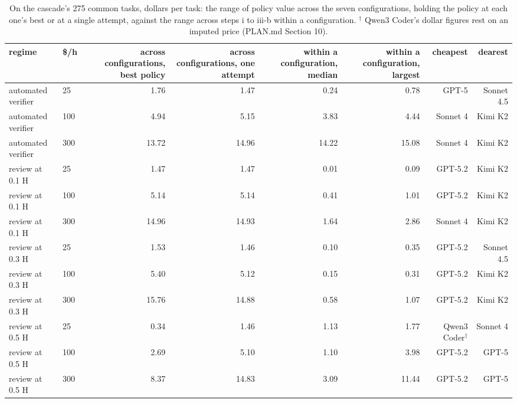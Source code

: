 \begin{table}[t]
\centering
\small
\caption{On the cascade's 275 common tasks, dollars per task: the range of policy value across the seven configurations, holding the policy at each one's best or at a single attempt, against the range across steps i to iii-b within a configuration. $^\dagger$ Qwen3 Coder's dollar figures rest on an imputed price (PLAN.md Section 10).}
\label{tab:tableA8_spread}
\begin{tabular}{llrrrrrr}
\toprule
regime & \$/h & across configurations, best policy & across configurations, one attempt & within a configuration, median & within a configuration, largest & cheapest & dearest \\
\midrule
automated verifier & 25 & 1.76 & 1.47 & 0.24 & 0.78 & GPT-5 & Sonnet 4.5 \\
automated verifier & 100 & 4.94 & 5.15 & 3.83 & 4.44 & Sonnet 4 & Kimi K2 \\
automated verifier & 300 & 13.72 & 14.96 & 14.22 & 15.08 & Sonnet 4 & Kimi K2 \\
\midrule
review at 0.1 H & 25 & 1.47 & 1.47 & 0.01 & 0.09 & GPT-5.2 & Kimi K2 \\
review at 0.1 H & 100 & 5.14 & 5.14 & 0.41 & 1.01 & GPT-5.2 & Kimi K2 \\
review at 0.1 H & 300 & 14.96 & 14.93 & 1.64 & 2.86 & Sonnet 4 & Kimi K2 \\
\midrule
review at 0.3 H & 25 & 1.53 & 1.46 & 0.10 & 0.35 & GPT-5.2 & Sonnet 4.5 \\
review at 0.3 H & 100 & 5.40 & 5.12 & 0.15 & 0.31 & GPT-5.2 & Kimi K2 \\
review at 0.3 H & 300 & 15.76 & 14.88 & 0.58 & 1.07 & GPT-5.2 & Kimi K2 \\
\midrule
review at 0.5 H & 25 & 0.34 & 1.46 & 1.13 & 1.77 & Qwen3 Coder$^\dagger$ & Sonnet 4 \\
review at 0.5 H & 100 & 2.69 & 5.10 & 1.10 & 3.98 & GPT-5.2 & GPT-5 \\
review at 0.5 H & 300 & 8.37 & 14.83 & 3.09 & 11.44 & GPT-5.2 & GPT-5 \\
\bottomrule
\end{tabular}
\end{table}
